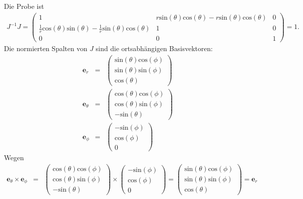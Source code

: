 \documentclass{book}
\renewcommand{\sin}{\text{sin}}
\renewcommand{\cos}{\text{cos}}
\begin{document}
%
Die Probe ist
%
\begin{eqnarray}
J^{-1}J = \left(\begin{array}{ccc}
1&r\sin\left(\theta\right)\cos\left(\theta\right) - r\sin\left(\theta\right)\cos\left(\theta\right)&0\\
\frac{1}{r}\cos\left(\theta\right)\sin\left(\theta\right) - \frac{1}{r}\sin\left(\theta\right)\cos\left(\theta\right)&1&0\\
0&0&1
\end{array}\right) = 1.
\end{eqnarray}
%
Die normierten Spalten von $J$ sind die ortsabhängigen Basisvektoren:
%
\begin{eqnarray}
\mathbf{e}_r & = & \left(\begin{array}{c}
\sin\left(\theta\right)\cos\left(\phi\right)\\
\sin\left(\theta\right)\sin\left(\phi\right)\\
\cos\left(\theta\right)
\end{array}\right)\label{eq:kugel_zu_global_1}\\
\mathbf{e}_\theta & = & \left(\begin{array}{c}
\cos\left(\theta\right)\cos\left(\phi\right)\\
\cos\left(\theta\right)\sin\left(\phi\right)\\
- \sin\left(\theta\right)
\end{array}\right)\label{eq:kugel_zu_global_2}\\
\mathbf{e}_\phi & = & \left(\begin{array}{c}
- \sin\left(\phi\right)\\
\cos\left(\phi\right)\\
0
\end{array}\right)\label{eq:kugel_zu_global_3}
\end{eqnarray}
%
Wegen
%
\begin{eqnarray}
\mathbf{e}_\theta \times \mathbf{e}_\phi & = & \left(\begin{array}{c}
\cos\left(\theta\right)\cos\left(\phi\right)\\
\cos\left(\theta\right)\sin\left(\phi\right)\\
-\sin\left(\theta\right)
\end{array}\right) \times \left(\begin{array}{c}
-\sin\left(\phi\right)\\
\cos\left(\phi\right)\\
0
\end{array}\right) = \left(\begin{array}{c}
\sin\left(\theta\right)\cos\left(\phi\right)\\
\sin\left(\theta\right)\sin\left(\phi\right)\\
\cos\left(\theta\right)
\end{array}\right) = \mathbf{e}_r
\end{eqnarray}
\end{document}
